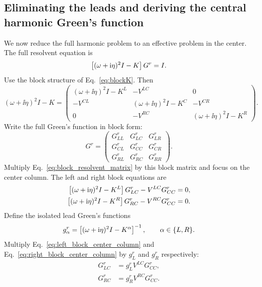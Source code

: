 \subsection{Eliminating the leads and deriving the central harmonic Green's function}
We now reduce the full harmonic problem to an effective problem in the center. The full resolvent equation is
\begin{equation}
    \left[ (\omega+\mathrm{i}\eta)^2 I - K \right]G^r = I.
\end{equation}
Use the block structure of Eq.~\eqref{eq:blockK}. Then
\begin{equation}
    (\omega+\ii\eta)^2I - K =
    \begin{pmatrix}
        (\omega+\ii\eta)^2I - K^L & -V^{LC} & 0 \\
        -V^{CL} & (\omega+\ii\eta)^2I - K^C & -V^{CR} \\
        0 & -V^{RC} & (\omega+\ii\eta)^2I - K^R
    \end{pmatrix}.
    \label{eq:block_resolvent_matrix}
\end{equation}
Write the full Green's function in block form:
\begin{equation}
    G^r =
    \begin{pmatrix}
        G_{LL}^r & G_{LC}^r & G_{LR}^r \\
        G_{CL}^r & G_{CC}^r & G_{CR}^r \\
        G_{RL}^r & G_{RC}^r & G_{RR}^r
    \end{pmatrix}.
\end{equation}
Multiply Eq.~\eqref{eq:block_resolvent_matrix} by this block matrix and focus on the center column. The left and right block equations are
\begin{align}
    \left[ (\omega+\mathrm{i}\eta)^2I - K^L \right]G_{LC}^r - V^{LC}G_{CC}^r &= 0,
    \label{eq:left_block_center_column} \\
    \left[ (\omega+\mathrm{i}\eta)^2I - K^R \right]G_{RC}^r - V^{RC}G_{CC}^r &= 0.
    \label{eq:right_block_center_column}
\end{align}
Define the isolated lead Green's functions
\begin{equation}
    g_\alpha^r = \left[ (\omega+\mathrm{i}\eta)^2I - K^\alpha \right]^{-1},
    \qquad \alpha \in \{L,R\}.
    \label{eq:isolated_lead_retarded}
\end{equation}
Multiply Eq.~\eqref{eq:left_block_center_column} and Eq.~\eqref{eq:right_block_center_column} by $g_L^r$ and $g_R^r$ respectively:
\begin{align}
    G_{LC}^r &= g_L^r V^{LC}G_{CC}^r,
    \label{eq:GLC_in_terms_of_GCC} \\
    G_{RC}^r &= g_R^r V^{RC}G_{CC}^r.
    \label{eq:GRC_in_terms_of_GCC}
\end{align}
